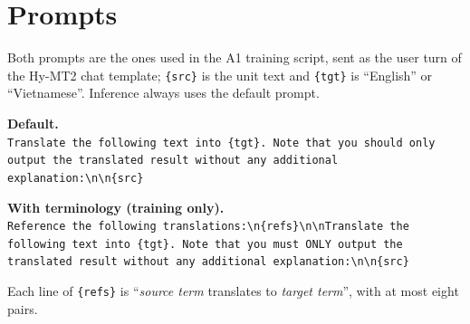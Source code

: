 \section{Prompts}
\label{app:prompts}
Both prompts are the ones used in the A1 training script, sent as the user turn of the Hy-MT2 chat template; \texttt{\{src\}} is the unit text and \texttt{\{tgt\}} is ``English'' or ``Vietnamese''.
Inference always uses the default prompt.
\par\vspace{1.4em}
\begin{small}
\noindent\textbf{Default.}\\
\texttt{Translate the following text into \{tgt\}. Note that you should only output the translated result without any additional explanation:\textbackslash n\textbackslash n\{src\}}

\vspace{1.4em}
\noindent\textbf{With terminology (training only).}\\
\texttt{Reference the following translations:\textbackslash n\{refs\}\textbackslash n\textbackslash nTranslate the following text into \{tgt\}. Note that you must ONLY output the translated result without any additional explanation:\textbackslash n\textbackslash n\{src\}}

\smallskip\noindent Each line of \texttt{\{refs\}} is ``\emph{source term} translates to \emph{target term}'', with at most eight pairs.
\end{small}


